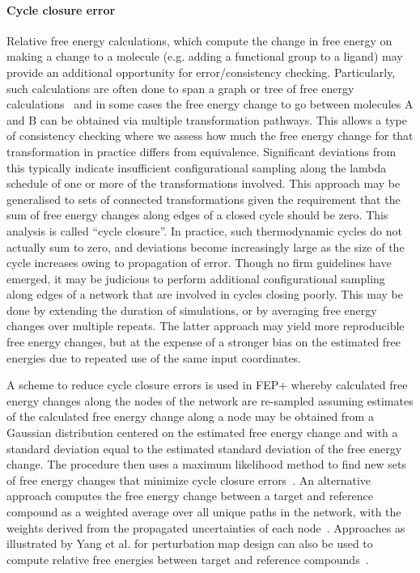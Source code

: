 \documentclass[9pt,bestpractices]{livecoms}
\begin{document}
\paragraph{Cycle closure error}
Relative free energy calculations, which compute the change in free energy on making a change to a molecule (e.g. adding a functional group to a ligand) may provide an additional opportunity for error/consistency checking. Particularly, such calculations are often done to span a graph or tree of free energy calculations~\cite{xu2019optimal,wang2013modeling,liu2013lead} and in some cases the free energy change to go between molecules A and B can be obtained via multiple transformation pathways. This allows a type of consistency checking where we assess how much the free energy change for that transformation in practice differs from equivalence. Significant deviations from this typically indicate insufficient configurational sampling along the lambda schedule of one or more of the transformations involved.
%
This approach may be generalised to sets of connected transformations given the requirement that the sum of free energy changes along edges of a closed cycle should be zero. This analysis is called ``cycle closure''. In practice, such thermodynamic cycles do not actually sum to zero,  and deviations become increasingly large as the size of the cycle increases owing to propagation of error. Though no firm guidelines have emerged, it may be judicious to perform additional configurational sampling along edges of a network that are involved in cycles closing poorly. This may be done by extending the duration of simulations, or by averaging free energy changes over multiple repeats. The latter approach may yield more reproducible free energy changes, but at the expense of a stronger bias on the estimated free energies due to repeated use of the same input coordinates.
%

A scheme to reduce cycle closure errors is used in FEP+ whereby calculated free energy changes along the nodes of the network are re-sampled assuming estimates of the calculated free energy change along a node may be obtained from a Gaussian distribution centered on the estimated free energy change and with a standard deviation equal to the estimated standard deviation of the free energy change. The procedure then uses a maximum likelihood method to find new sets of free energy changes that minimize cycle closure errors~\cite{wang2013modeling}. An alternative approach computes the free energy change between a target and reference compound as a weighted average over all unique paths in the network, with the weights derived from the propagated uncertainties of each node~\cite{mey2016blinded}. Approaches as illustrated by Yang et al. for perturbation map design can also be used to compute relative free energies between target and reference compounds~\cite{yang2020optimal}.
\end{document}
